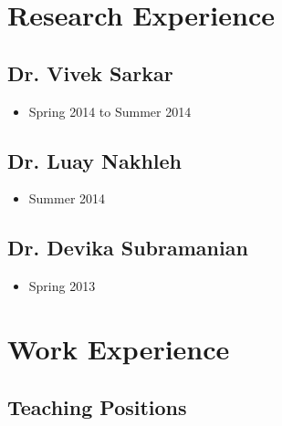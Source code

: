 \documentclass[a4paper]{article}
\begin{document}






\section{Research Experience}

\subsection{Dr. Vivek Sarkar}
\begin{itemize}
    \item{Spring 2014 to Summer 2014}
\end{itemize}

\subsection{Dr. Luay Nakhleh}
\begin{itemize}
    \item{Summer 2014}
\end{itemize}

\subsection{Dr. Devika Subramanian}
\begin{itemize}
    \item{Spring 2013}
\end{itemize}





\pagebreak
\section{Work Experience}

\subsection{Teaching Positions}
\end{document}
